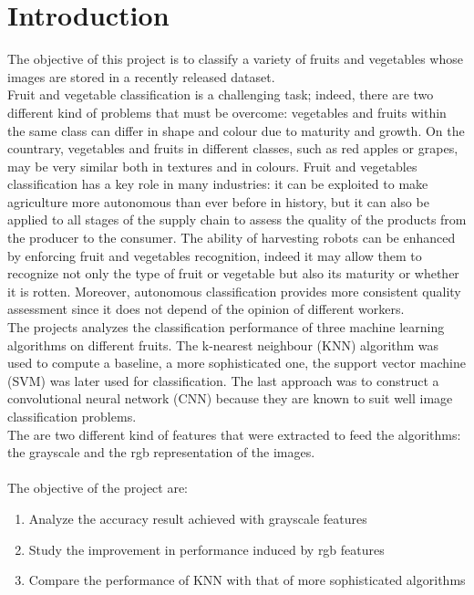 \documentclass{article}
\begin{document}
\section{Introduction}
The objective of this project is to classify a variety of fruits and vegetables whose images are stored in a recently released dataset.\\
Fruit and vegetable classification is a challenging task; indeed, there are two different kind of problems that must be overcome: vegetables and fruits within the same class can differ in shape and colour due to maturity and growth. On the countrary, vegetables and fruits in different classes, such as red apples or grapes, may be very similar both in textures and in colours. 
Fruit and vegetables classification has a key role in many industries: it can be exploited to make agriculture more autonomous than ever before in history, but it can also be applied to all stages of the supply chain to assess the quality of the products from the producer to the consumer. 
The ability of harvesting robots can be enhanced by enforcing fruit and vegetables recognition, indeed it may allow them to recognize not only the type of fruit or vegetable but also its maturity or whether it is rotten. Moreover, autonomous classification provides more consistent quality assessment since it does not depend of the opinion of different workers. \cite{review}
\\
The projects analyzes the classification performance of three machine learning algorithms on different fruits. The k-nearest neighbour (KNN) algorithm was used to compute a baseline, a more sophisticated one, the support vector machine (SVM) was later used for classification. The last approach was to construct a convolutional neural network (CNN) because they are known to suit well image classification problems. \\
The are two different kind of features that were extracted to feed the algorithms: the grayscale and the rgb representation of the images.\\\\
The objective of the project are:
\begin{enumerate}
\item Analyze the accuracy result achieved with grayscale features
\item Study the improvement in performance induced by rgb features
\item Compare the performance of KNN with that of more sophisticated algorithms
\end{enumerate}
\end{document}
